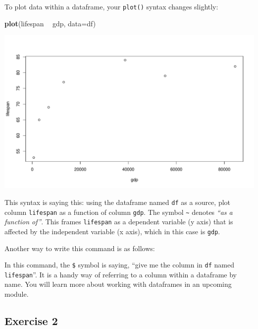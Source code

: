\documentclass[
]{book}
\newenvironment{Shaded}{\begin{snugshade}}{\end{snugshade}}
\newcommand{\DataTypeTok}[1]{\textcolor[rgb]{0.13,0.29,0.53}{#1}}
\newcommand{\KeywordTok}[1]{\textcolor[rgb]{0.13,0.29,0.53}{\textbf{#1}}}
\newcommand{\NormalTok}[1]{#1}
\newcommand{\OperatorTok}[1]{\textcolor[rgb]{0.81,0.36,0.00}{\textbf{#1}}}
\newcommand{\StringTok}[1]{\textcolor[rgb]{0.31,0.60,0.02}{#1}}
\begin{document}
To plot data within a dataframe, your \texttt{plot()} syntax changes slightly:

\begin{Shaded}
\begin{Highlighting}[]
\KeywordTok{plot}\NormalTok{(lifespan }\OperatorTok{~}\StringTok{ }\NormalTok{gdp, }\DataTypeTok{data=}\NormalTok{df)}
\end{Highlighting}
\end{Shaded}

\includegraphics{figures/unnamed-chunk-118-1.pdf}

This syntax is saying this: using the dataframe named \texttt{df} as a source, plot column \texttt{lifespan} as a function of column \texttt{gdp}. The symbol \texttt{\textasciitilde{}} denotes \emph{``as a function of''}. This frames \texttt{lifespan} as a dependent variable (y axis) that is affected by the independent variable (x axis), which in this case is \texttt{gdp}.

Another way to write this command is as follows:

\begin{Shaded}
\end{Shaded}

In this command, the \texttt{\$} symbol is saying, ``give me the column in \texttt{df} named \texttt{lifespan}''. It is a handy way of referring to a column within a dataframe by name. You will learn more about working with dataframes in an upcoming module.

\hypertarget{exercise-2-3}{%
\subsection*{Exercise 2}\label{exercise-2-3}}
\end{document}
